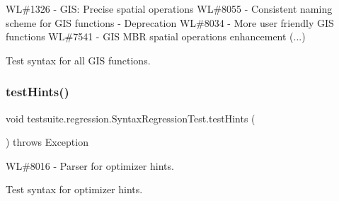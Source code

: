 WL\#1326 -\/ G\+IS\+: Precise spatial operations WL\#8055 -\/ Consistent naming scheme for G\+IS functions -\/ Deprecation WL\#8034 -\/ More user friendly G\+IS functions WL\#7541 -\/ G\+IS M\+BR spatial operations enhancement (...)

Test syntax for all G\+IS functions. \mbox{\label{classtestsuite_1_1regression_1_1_syntax_regression_test_a0ce60cad9433c889e455f260ea073888}} 
\subsubsection{\texorpdfstring{test\+Hints()}{testHints()}}
{\footnotesize\ttfamily void testsuite.\+regression.\+Syntax\+Regression\+Test.\+test\+Hints (\begin{DoxyParamCaption}{ }\end{DoxyParamCaption}) throws Exception}

WL\#8016 -\/ Parser for optimizer hints.

Test syntax for optimizer hints.

